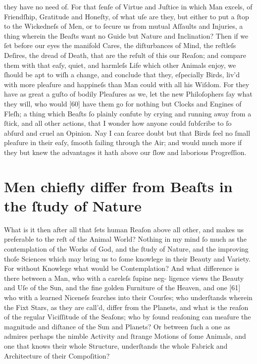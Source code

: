 \documentclass[letterpaper]{book}
\begin{document}
they have no need of. For that ſenſe of Virtue and Juſtice in which Man
excels, of Friendſhip, Gratitude and Honeſty, of what uſe are they, but
either to put a ſtop to the Wickedneſs of Men, or to ſecure us from mutual
Aſſaults and Injuries, a thing wherein the Beaſts want no Guide but Nature
and Inclination? Then if we ſet before our eyes the manifold Cares, the
diſturbances of Mind, the reſtleſs Deſires, the dread of Death, that are the
reſult of this our Reaſon; and compare them with that eaſy, quiet, and
harmleſs Life which other Animals enjoy, we ſhould be apt to wiſh a
change, and conclude that they, eſpecially Birds, liv'd with more pleaſure
and happineſs than Man could with all his Wiſdom. For they have as great a
guſto of bodily Pleaſures as we, let the new Philoſophers ſay what they
will, who would [60] have them go for nothing but Clocks and Engines of
Fleſh; a thing which Beaſts ſo plainly confute by crying and running away
from a ſtick, and all other actions, that I wonder how anyone could
ſubſcribe to ſo abſurd and cruel an Opinion. Nay I can ſcarce doubt but that
Birds feel no ſmall pleaſure in their eaſy, ſmooth ſailing through the Air;
and would much more if they but knew the advantages it hath above our ſlow
and laborious Progreſſion.



\section{Men chiefly differ from Beaſts in the ſtudy of Nature}

What is it then after all that ſets human Reaſon above all other, and makes
us preferable to the reſt of the Animal World? Nothing in my mind ſo much
as the contemplation of the Works of God, and the ſtudy of Nature, and
the improving thoſe Sciences which may bring us to ſome knowlege in their
Beauty and Variety. For without Knowlege what would be Contemplation?
And what difference is there between a Man, who with a careleſs ſupine neg-
ligence views the Beauty and Uſe of the Sun, and the fine golden Furniture
of the Heaven, and one [61] who with a learned Niceneſs ſearches into their
Courſes; who underſtands wherein the Fixt Stars, as they are call'd, differ
from the Planets, and what is the reaſon of the regular Viciſſitude of the
Seaſons; who by ſound reaſoning can meaſure the magnitude and diſtance
of the Sun and Planets? Or between ſuch a one as admires perhaps the
nimble Activity and ſtrange Motions of ſome Animals, and one that knows
their whole Structure, underſtands the whole Fabrick and Architecture of
their Compoſition?
\end{document}
